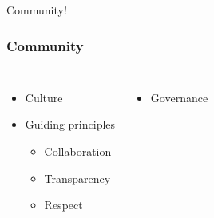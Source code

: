\documentclass[aspectratio=169,11pt,hyperref={colorlinks=true}]{beamer}
\begin{document}
\begin{frame}[c]
  \begin{center}
      \color{white}
      \Huge Community!
  \end{center}
\end{frame}


\begin{frame}
  \frametitle{Community}
  \begin{columns}
    \begin{itemize}
      \item{Culture}
      \item{Guiding principles}
      \begin{itemize}
          \item{Collaboration}
          \item{Transparency}
          \item{Respect}
      \end{itemize}
    \end{itemize}
    \begin{itemize}
        \item{Governance}
    \end{itemize}
  \end{columns}
\end{frame}

\end{document}
